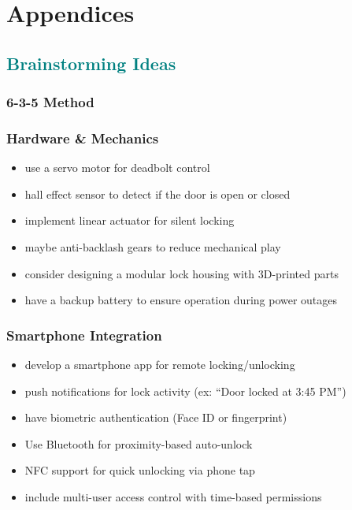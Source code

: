 \section{Appendices}

\textcolor{teal}{\subsection{Brainstorming Ideas}} \label{BrainstormingIdeas}

\subsubsection{6-3-5 Method}
\subsubsection*{Hardware \& Mechanics}
\begin{itemize}
    \item use a servo motor for deadbolt control
    \item hall effect sensor to detect if the door is open or closed
    \item implement linear actuator for silent locking
    \item maybe anti-backlash gears to reduce mechanical play
    \item consider designing a modular lock housing with 3D-printed parts
    \item have a backup battery to ensure operation during power outages
\end{itemize}

\subsubsection*{Smartphone Integration}
\begin{itemize}
    \item develop a smartphone app for remote locking/unlocking
    \item push notifications for lock activity (ex: ``Door locked at 3:45 PM'')
    \item have biometric authentication (Face ID or fingerprint)
    \item Use Bluetooth for proximity-based auto-unlock
    \item NFC support for quick unlocking via phone tap
    \item include multi-user access control with time-based permissions
\end{itemize}

